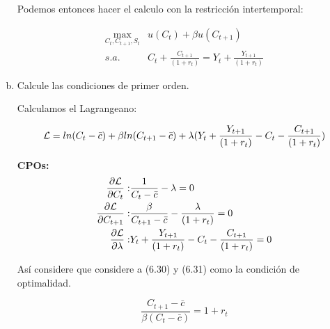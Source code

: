 \begin{enumerate}[a)]
    Podemos entonces hacer el calculo con la restricción intertemporal: 
    
    \begin{align*}
        \max_{C_{t}, C_{t+1}, S_{t}} & u(C_{t})+\beta u(C_{t+1})\\
        s.a. &  C_{t}+ \frac{ C_{t+1}}{(1+r_{t})} = Y_{t}+\frac{ Y_{t+1}}{(1+r_{t})}  
    \end{align*}
    \item Calcule las condiciones de primer orden.
    
    Calculamos el Lagrangeano:
    
    \begin{equation}
        {\cal L} = ln(C_{t}-\bar{c}) +\beta ln(C_{t+1}-\bar{c})+\lambda(Y_{t}+\frac{ Y_{t+1}}{(1+r_{t})} - C_{t}- \frac{ C_{t+1}}{(1+r_{t})})
    \end{equation}
    
    \textbf{CPOs:}
    \begin{align}
    \frac{\partial {\cal L}}{\partial C_{t}}: & \frac{1}{C_{t}-\bar{c}}-\lambda=0\\
    \frac{\partial {\cal L}}{\partial C_{t+1}}: & \frac{\beta}{C_{t+1}-\bar{c}}-\frac{\lambda}{(1+r_{t})}=0\\
    \frac{\partial {\cal L}}{\partial \lambda}: & Y_{t}+\frac{ Y_{t+1}}{(1+r_{t})} - C_{t}- \frac{ C_{t+1}}{(1+r_{t})}=0
    \end{align}
    
    Así considere que considere a (6.30) y (6.31) como la condición de optimalidad. 
    
    \begin{equation}
        \frac{C_{t+1}-\bar{c}}{\beta(C_{t}-\bar{c})} = 1+r_{t}
    \end{equation}
    
\end{enumerate}